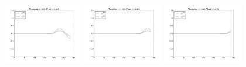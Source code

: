\documentclass{article} %
\theoremstyle{plain}
\numberwithin{equation}{section} %
\numberwithin{figure}{section} %
\numberwithin{table}{section} %
\begin{document}
\begin{enumerate}[\ \ (a)]
\begin{figure}[ht!]
            \includegraphics[width=0.31\textwidth]{figures/problem_1_c_096.png}
            \includegraphics[width=0.31\textwidth]{figures/problem_1_c_104.png}
            \includegraphics[width=0.31\textwidth]{figures/problem_1_c_111.png}
        \end{figure}
        \FloatBarrier
        \pagebreak


\end{enumerate}
\end{document}
